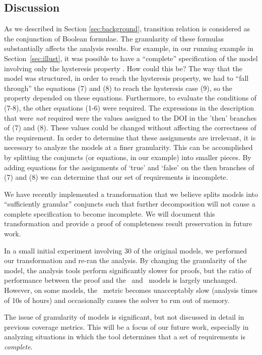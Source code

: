 \subsection{Discussion}
\label{sec:discussion}

As we described in Section \ref{sec:background}, transition relation is considered
as the conjunction of Boolean formulae.   The granularity of these formulas substantially affects the analysis results.  For example, in our running example in Section~\ref{sec:illust}, it was possible to have a ``complete'' specification of the model involving only the hysteresis property \hystp.  How could this be?  The way that the model was structured, in order to reach the hysteresis property, we had to ``fall through'' the equations (7) and (8) to reach the hysteresis case (9), so the property depended on these equations.  Furthermore, to evaluate the conditions of (7-8), the other equations (1-6) were required.  The expressions in the description that were {\em not} required were the values assigned to the DOI in the 'then' branches of (7) and (8).  These values could be changed without affecting the correctness of the requirement.  In order to determine that these assignments are irrelevant, it is necessary to analyze the models at a finer granularity.  This can be accomplished by splitting the conjuncts (or equations, in our example) into smaller pieces.  By adding equations for the assignments of `true' and `false' on the then branches of (7) and (8) we can determine that our set of requirements is incomplete.

%
We have recently implemented a transformation that we believe splits models into ``sufficiently granular'' conjuncts such that further decomposition will not cause a complete specification to become incomplete.  We will document this transformation and provide a proof of completeness result preservation in future work.

In a small initial experiment involving 30 of the original models, we performed our transformation and re-ran the analysis.  By changing the granularity of the model, the analysis tools perform significantly slower for proofs, but the ratio of performance between the proof and the \ucalg\ and \nondetcov\ models is largely unchanged.  However, on some models, the \nondetcov\ metric becomes unacceptably slow (analysis times of 10s of hours) and occasionally causes the solver to run out of memory.

The issue of granularity of models is significant, but not discussed in detail in previous coverage metrics.  This will be a focus of our future work, especially in analyzing situations in which the tool determines that a set of requirements is {\em complete}.  

